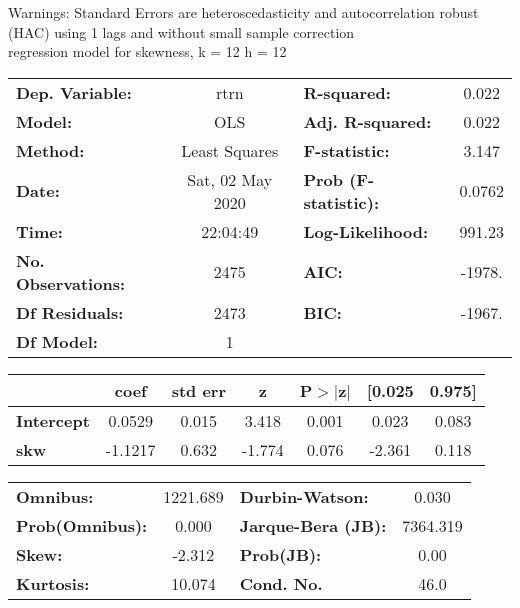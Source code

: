 Warnings: \newline
 [1] Standard Errors are heteroscedasticity and autocorrelation robust (HAC) using 1 lags and without small sample correction\\ 

regression model for skewness, k = 12 h = 12\begin{center}
\begin{tabular}{lclc}
\toprule
\textbf{Dep. Variable:}    &       rtrn       & \textbf{  R-squared:         } &     0.022   \\
\textbf{Model:}            &       OLS        & \textbf{  Adj. R-squared:    } &     0.022   \\
\textbf{Method:}           &  Least Squares   & \textbf{  F-statistic:       } &     3.147   \\
\textbf{Date:}             & Sat, 02 May 2020 & \textbf{  Prob (F-statistic):} &   0.0762    \\
\textbf{Time:}             &     22:04:49     & \textbf{  Log-Likelihood:    } &    991.23   \\
\textbf{No. Observations:} &        2475      & \textbf{  AIC:               } &    -1978.   \\
\textbf{Df Residuals:}     &        2473      & \textbf{  BIC:               } &    -1967.   \\
\textbf{Df Model:}         &           1      & \textbf{                     } &             \\
\bottomrule
\end{tabular}
\begin{tabular}{lcccccc}
                   & \textbf{coef} & \textbf{std err} & \textbf{z} & \textbf{P$> |$z$|$} & \textbf{[0.025} & \textbf{0.975]}  \\
\midrule
\textbf{Intercept} &       0.0529  &        0.015     &     3.418  &         0.001        &        0.023    &        0.083     \\
\textbf{skw}       &      -1.1217  &        0.632     &    -1.774  &         0.076        &       -2.361    &        0.118     \\
\bottomrule
\end{tabular}
\begin{tabular}{lclc}
\textbf{Omnibus:}       & 1221.689 & \textbf{  Durbin-Watson:     } &    0.030  \\
\textbf{Prob(Omnibus):} &   0.000  & \textbf{  Jarque-Bera (JB):  } & 7364.319  \\
\textbf{Skew:}          &  -2.312  & \textbf{  Prob(JB):          } &     0.00  \\
\textbf{Kurtosis:}      &  10.074  & \textbf{  Cond. No.          } &     46.0  \\
\bottomrule
\end{tabular}
\end{center}

